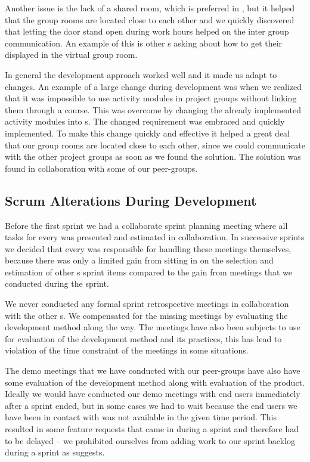 Another issue is the lack of a shared room, which is preferred in \sos{}, but it helped that the group rooms are located close to each other and we quickly discovered that letting the door stand open during work hours helped on the inter group communication. 
An example of this is other \subgroup{}s asking about how to get their \block{} displayed in the virtual group room.

In general the development approach worked well and it made us adapt to changes. 
An example of a large change during development was when we realized that it was impossible to use activity modules in project groups without linking them through a course.
This was overcome by changing the already implemented activity modules into \block[]s. 
The changed requirement was embraced and quickly implemented.
To make this change quickly and effective it helped a great deal that our group rooms are located close to each other, since we could communicate with the other project groups as soon as we found the solution.
The solution was found in collaboration with some of our peer-groups.

\subsection{Scrum Alterations During Development}
Before the first sprint we had a collaborate sprint planning meeting where all tasks for every \subgroup{} was presented and estimated in collaboration.
In successive sprints we decided that every \subgroup{} was responsible for handling these meetings themselves, because there was only a limited gain from sitting in on the selection and estimation of other \subgroup{}s sprint items compared to the gain from \sos{} meetings that we conducted during the sprint.

We never conducted any formal sprint retrospective meetings in collaboration with the other \subgroup{}s.
We compensated for the missing meetings by evaluating the development method along the way.
The \sos{} meetings have also been subjects to use for evaluation of the development method and its practices, this has lead to violation of the time constraint of the \sos{} meetings in some situations.

The demo meetings that we have conducted with our peer-groups have also have some evaluation of the development method along with evaluation of the product.
Ideally we would have conducted our demo meetings with end users immediately after a sprint ended, but in some cases we had to wait because the end users we have been in contact with was not available in the given time period.
This resulted in some feature requests that came in during a sprint and therefore had to be delayed -- we prohibited ourselves from adding work to our sprint backlog during a sprint as \scrum{} suggests.
